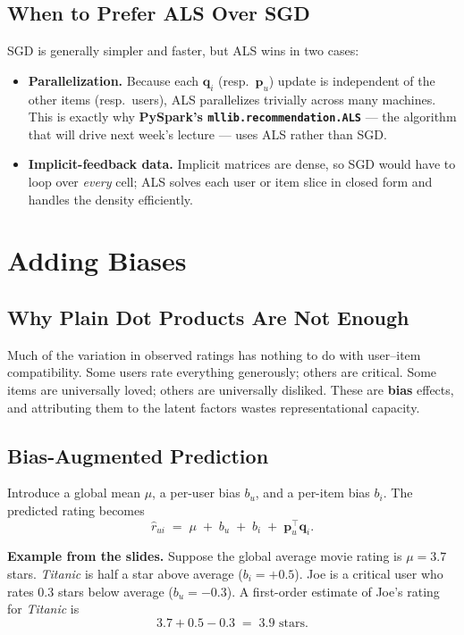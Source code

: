 \documentclass[11pt]{article}
\begin{document}
\subsection{When to Prefer ALS Over SGD}
SGD is generally simpler and faster, but ALS wins in two cases:
\begin{itemize}
    \item \textbf{Parallelization.} Because each $\mathbf{q}_i$ (resp.\ $\mathbf{p}_u$) update is independent of the other items (resp.\ users), ALS parallelizes trivially across many machines. This is exactly why \textbf{PySpark's \texttt{mllib.recommendation.ALS}} --- the algorithm that will drive next week's lecture --- uses ALS rather than SGD.
    \item \textbf{Implicit-feedback data.} Implicit matrices are dense, so SGD would have to loop over \emph{every} cell; ALS solves each user or item slice in closed form and handles the density efficiently.
\end{itemize}


\section{Adding Biases}

\subsection{Why Plain Dot Products Are Not Enough}
Much of the variation in observed ratings has nothing to do with user--item compatibility. Some users rate everything generously; others are critical. Some items are universally loved; others are universally disliked. These are \textbf{bias} effects, and attributing them to the latent factors wastes representational capacity.

\subsection{Bias-Augmented Prediction}
Introduce a global mean $\mu$, a per-user bias $b_u$, and a per-item bias $b_i$. The predicted rating becomes
\begin{equation}
    \hat{r}_{ui} \;=\; \mu \;+\; b_u \;+\; b_i \;+\; \mathbf{p}_u^{\top}\mathbf{q}_i.
\end{equation}

\textbf{Example from the slides.} Suppose the global average movie rating is $\mu = 3.7$ stars. \emph{Titanic} is half a star above average ($b_i = +0.5$). Joe is a critical user who rates 0.3 stars below average ($b_u = -0.3$). A first-order estimate of Joe's rating for \emph{Titanic} is
\[
    3.7 + 0.5 - 0.3 \;=\; 3.9 \text{ stars.}
\]
\end{document}
